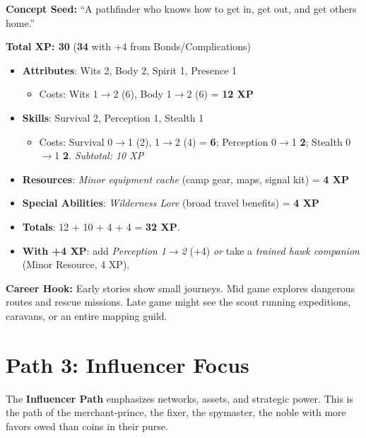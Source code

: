 \textbf{Concept Seed:} ``A pathfinder who knows how to get in, get out, and get others home.''

\medskip

\noindent\textbf{Total XP: 30} \quad (\textbf{34} with +4 from Bonds/Complications)

\begin{itemize}
\item \textbf{Attributes}: Wits 2, Body 2, Spirit 1, Presence 1
  \begin{itemize}
  \item Costs: Wits 1\(\to\)2 (6), Body 1\(\to\)2 (6) = \textbf{12 XP}
  \end{itemize}
\item \textbf{Skills}: Survival 2, Perception 1, Stealth 1
  \begin{itemize}
  \item Costs: Survival 0\(\to\)1 (2), 1\(\to\)2 (4) = \textbf{6};  
        Perception 0\(\to\)1 \textbf{2};  
        Stealth 0\(\to\)1 \textbf{2}.  
        \emph{Subtotal: 10 XP}
  \end{itemize}
\item \textbf{Resources}: \emph{Minor equipment cache} (camp gear, maps, signal kit) = \textbf{4 XP}
\item \textbf{Special Abilities}: \emph{Wilderness Lore} (broad travel benefits) = \textbf{4 XP}
\item \textbf{Totals}: 12 + 10 + 4 + 4 = \textbf{32 XP}.
\item \textbf{With +4 XP}: add \emph{Perception 1\(\to\)2} (+4) \emph{or} take a \emph{trained hawk companion} (Minor Resource, 4 XP).
\end{itemize}

\noindent\textbf{Career Hook:} Early stories show small journeys. Mid game explores
dangerous routes and rescue missions. Late game might see the scout running
expeditions, caravans, or an entire mapping guild.


\section{Path 3: Influencer Focus}
\label{sec:xp-influencer-path}

The \textbf{Influencer Path} emphasizes networks, assets, and strategic power.
This is the path of the merchant-prince, the fixer, the spymaster, the noble
with more favors owed than coins in their purse.


